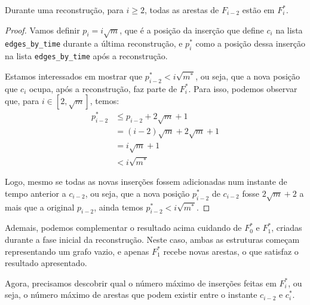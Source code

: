 \begin{theorem}
    \label{teo:adicao-arestas}
    Durante uma reconstrução, para $i \geq 2$, todas as arestas de $F_{i-2}$ estão em $F_i^*$.
\end{theorem}
\begin{proof}

    Vamos definir $p_i = i \sqrt{m}$, que é a posição da inserção que define $c_i$ na lista \texttt{edges\_by\_time} durante a última reconstrução, e $p_i^*$ como a posição dessa inserção na lista \texttt{edges\_by\_time} após a reconstrução.

    Estamos interessados em mostrar que $p_{i-2}^* < i\sqrt{m^*}$, ou seja, que a nova posição que $c_i$ ocupa, após a reconstrução, faz parte de $F_i^*$. Para isso, podemos observar que, para $i \in [2, \sqrt{m}]$, temos:
    \begin{align*}
        p_{i-2}^* & \leq p_{i-2} + 2\sqrt{m} + 1     \\
                  & = (i-2) \sqrt{m} + 2\sqrt{m} + 1 \\
                  & = i \sqrt{m} + 1                 \\
                  & < i \sqrt{m^*}
    \end{align*}

    Logo, mesmo se todas as novas inserções fossem adicionadas num instante de tempo anterior a $c_{i-2}$, ou seja, que a nova posição $p_{i-2}^*$ de $c_{i-2}$ fosse $2\sqrt{m} + 2$ a mais que a original $p_{i-2}$, ainda temos $p_{i-2}^* < i \sqrt{m^*}$.
\end{proof}

Ademais, podemos complementar o resultado acima cuidando de $F_0^*$ e $F_1^*$, criadas durante a fase inicial da reconstrução. Neste caso, ambas as estruturas começam representando um grafo vazio, e apenas $F_1^*$ recebe novas arestas, o que satisfaz o resultado apresentado.

Agora, precisamos descobrir qual o número máximo de inserções feitas em $F_i^*$, ou seja, o número máximo de arestas que podem existir entre o instante $c_{i-2}$ e $c_i^*$.

